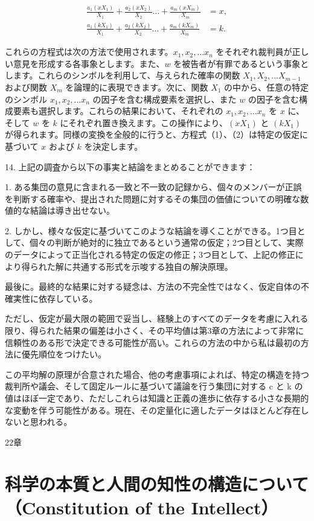 \documentclass[a4paper,11pt,openany]{ltjsbook}
\begin{document}
\begin{align*}
  \frac{a_1(xX_1)}{X_1}
+ \frac{a_2(xX_2)}{X_2} \dotsc
+ \frac{a_m(xX_m)}{X_m} &= x,     \tag{1}
\\
  \frac{a_1(kX_1)}{X_1}
+ \frac{a_2(kX_2)}{X_2} \dotsc
+ \frac{a_m(kX_m)}{X_m} &= k.     \tag{2}
\end{align*}

これらの方程式は次の方法で使用されます。$x_1, x_2, \dotsc x_n$ をそれぞれ裁判員が正しい意見を形成する各事象とします。また、$w$ を被告者が有罪であるという事象とします。これらのシンボルを利用して、与えられた確率の関数 $X_1, X_2,\dotsc X_{m-1}$ および関数 $X_m$ を論理的に表現できます。次に、関数 $X_1$ の中から、任意の特定のシンボル $x_1, x_2, \dotsc x_n$ の因子を含む構成要素を選択し、また $w$ の因子を含む構成要素も選択します。これらの結果において、それぞれの $x_1, x_2, \dotsc x_n$ を $x$ に、そして $w$ を $k$ にそれぞれ置き換えます。この操作により、$(xX_1)$ と $(kX_1)$ が得られます。同様の変換を全般的に行うと、方程式（1）、（2）は特定の仮定に基づいて $x$ および $k$ を決定します。

14. 上記の調査から以下の事実と結論をまとめることができます：

1. ある集団の意見に含まれる一致と不一致の記録から、個々のメンバーが正誤を判断する確率や、提出された問題に対するその集団の価値についての明確な数値的な結論は導き出せない。

2. しかし、様々な仮定に基づいてこのような結論を導くことができる。1つ目として、個々の判断が絶対的に独立であるという通常の仮定；2つ目として、実際のデータによって正当化される特定の仮定の修正；3つ目として、上記の修正により得られた解に共通する形式を示唆する独自の解決原理。

最後に。最終的な結果に対する疑念は、方法の不完全性ではなく、仮定自体の不確実性に依存している。

ただし、仮定が最大限の範囲で妥当し、経験上のすべてのデータを考慮に入れる限り、得られた結果の偏差は小さく、その平均値は第3章の方法によって非常に信頼性のある形で決定できる可能性が高い。これらの方法の中から私は最初の方法に優先順位をつけたい。

この平均解の原理が合意された場合、他の考慮事項によれば、特定の構造を持つ裁判所や議会、そして固定ルールに基づいて議論を行う集団に対する c と k の値はほぼ一定であり、ただしこれらは知識と正義の進歩に依存する小さな長期的な変動を伴う可能性がある。現在、その定量化に適したデータはほとんど存在しないと思われる。

22章

\newpage

\chapter{科学の本質と人間の知性の構造について（Constitution of the Intellect）}
\label{ch:xxii}
\end{document}
